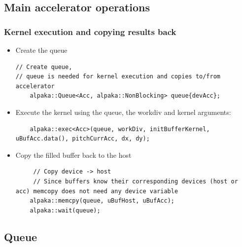 \documentclass[9pt]{beamer}
\begin{document}
\subsection{Main accelerator operations}
\begin{frame}[fragile]
\frametitle{Kernel execution and copying results back}
\begin{itemize}

\item Create the queue
\lstset{basicstyle=\ttfamily\scriptsize}
\begin{lstlisting}
// Create queue,
// queue is needed for kernel execution and copies to/from accelerator
    alpaka::Queue<Acc, alpaka::NonBlocking> queue{devAcc};
\end{lstlisting}

\item Execute the kernel using the queue, the workdiv and kernel arguments:
\lstset{basicstyle=\ttfamily\scriptsize}
\begin{lstlisting}
    alpaka::exec<Acc>(queue, workDiv, initBufferKernel, uBufAcc.data(), pitchCurrAcc, dx, dy);
\end{lstlisting}
\item Copy the filled buffer back to the host
\begin{lstlisting}
     // Copy device -> host
     // Since buffers know their corresponding devices (host or acc) memcopy does not need any device variable
    alpaka::memcpy(queue, uBufHost, uBufAcc);
    alpaka::wait(queue);
\end{lstlisting}
\end{itemize}
\end{frame}

\subsection{Queue}
\end{document}
